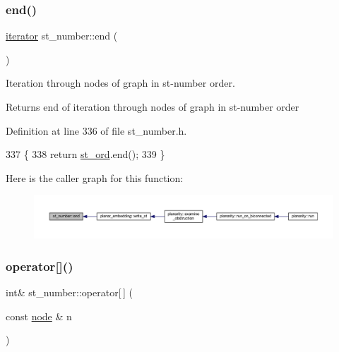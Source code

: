 \subsubsection{\texorpdfstring{end()}{end()}}
{\footnotesize\ttfamily \mbox{\hyperlink{classst__number_a3aa3701636f69a567c5f6a676afafd39}{iterator}} st\+\_\+number\+::end (\begin{DoxyParamCaption}{ }\end{DoxyParamCaption})\hspace{0.3cm}{\ttfamily [inline]}}



Iteration through nodes of graph in st-\/number order. 

\begin{DoxyReturn}{Returns}
end of iteration through nodes of graph in st-\/number order 
\end{DoxyReturn}


Definition at line 336 of file st\+\_\+number.\+h.


\begin{DoxyCode}
337     \{
338     \textcolor{keywordflow}{return} \mbox{\hyperlink{classst__number_af2160b5e111fe3730b4f9f3f3d09f98f}{st\_ord}}.end();
339     \}
\end{DoxyCode}
Here is the caller graph for this function\+:\nopagebreak
\begin{figure}[H]
\begin{center}
\leavevmode
\includegraphics[width=350pt]{classst__number_a3912b83a8cbddcb1fc804d20be528d52_icgraph}
\end{center}
\end{figure}
\mbox{\label{classst__number_a969162a10da5daba4219419d45c4be51}} 
\subsubsection{\texorpdfstring{operator[]()}{operator[]()}}
{\footnotesize\ttfamily int\& st\+\_\+number\+::operator\mbox{[}$\,$\mbox{]} (\begin{DoxyParamCaption}\item[{const \mbox{\hyperlink{classnode}{node}} \&}]{n }\end{DoxyParamCaption})\hspace{0.3cm}{\ttfamily [inline]}}



